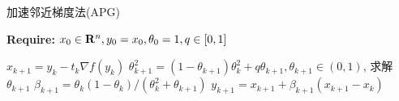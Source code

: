 \begin{algorithm}
\caption{加速邻近梯度法\cite{nesterov1983method,nesterov1998introductory}(APG)}
\label{alg:accelerated_proximal_gradient}
{\bf Require:} $x_0\in {\bf R}^n, y_0=x_0, \theta_0=1, q\in[0,1]$
\begin{algorithmic}[1]
	\State $x_{k+1}=y_k-t_k\nabla f(y_k)$
	\State $\theta_{k+1}^2=(1-\theta_{k+1})\theta_k^2+q\theta_{k+1}, \theta_{k+1}\in (0,1)$, 求解 $\theta_{k+1}$
	\State $\beta_{k+1}=\theta_k(1-\theta_k)/(\theta_k^2+\theta_{k+1})$
	\State $y_{k+1}=x_{k+1}+\beta_{k+1}(x_{k+1}-x_k)$
\EndFor
\end{algorithmic}
\end{algorithm}